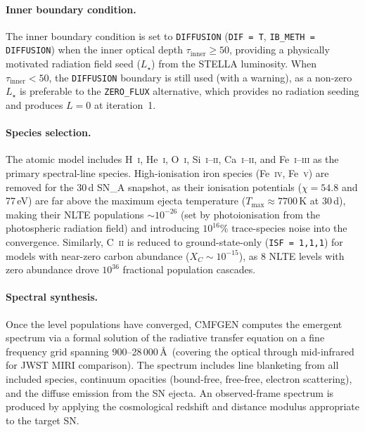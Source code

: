 \documentclass[11pt, a4paper]{article}
\newcommand{\Lstar}{\ensuremath{L_\star}}
\begin{document}
\paragraph{Inner boundary condition.}
The inner boundary condition is set to \texttt{DIFFUSION}
(\texttt{DIF\,=\,T}, \texttt{IB\_METH\,=\,DIFFUSION}) when the inner
optical depth $\tau_{\mathrm{inner}} \geq 50$, providing a physically
motivated radiation field seed ($\Lstar$) from the STELLA luminosity.
When $\tau_{\mathrm{inner}} < 50$, the \texttt{DIFFUSION} boundary is
still used (with a warning), as a non-zero $\Lstar$ is preferable to the
\texttt{ZERO\_FLUX} alternative, which provides no radiation seeding and
produces $L = 0$ at iteration~1.

\paragraph{Species selection.}
The atomic model includes H~\textsc{i}, He~\textsc{i}, O~\textsc{i},
Si~\textsc{i--ii}, Ca~\textsc{i--ii}, and Fe~\textsc{i--iii} as the
primary spectral-line species.  High-ionisation iron species
(Fe~\textsc{iv}, Fe~\textsc{v}) are removed for the 30\,d SN\_A snapshot,
as their ionisation potentials ($\chi = 54.8$ and 77\,eV) are far above
the maximum ejecta temperature ($T_{\max} \approx 7700$\,K at 30\,d),
making their NLTE populations $\sim$$10^{-26}$ (set by photoionisation
from the photospheric radiation field) and introducing $10^{16}\%$
trace-species noise into the convergence.  Similarly, C~\textsc{ii} is
reduced to ground-state-only (\texttt{ISF\,=\,1,1,1}) for models with
near-zero carbon abundance ($X_C \sim 10^{-15}$), as 8 NLTE levels with
zero abundance drove $10^{36}$ fractional population cascades.

\paragraph{Spectral synthesis.}
Once the level populations have converged, CMFGEN computes the emergent
spectrum via a formal solution of the radiative transfer equation on a
fine frequency grid spanning 900--28\,000\,\AA\ (covering the optical
through mid-infrared for JWST MIRI comparison).  The spectrum includes
line blanketing from all included species, continuum opacities
(bound-free, free-free, electron scattering), and the diffuse emission
from the SN ejecta.  An observed-frame spectrum is produced by applying
the cosmological redshift and distance modulus appropriate to the target
SN.
\end{document}
